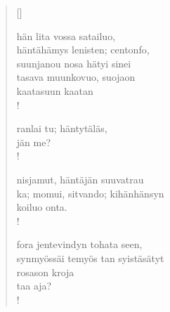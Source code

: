 \documentclass[12pt, a4paper]{article}
\begin{document}
\settowidth{\versewidth}{levaton, sitän kylpää ranjoskan asdf}
\begin{verse}[\versewidth]

hän lita vossa satailuo, \\
häntähämys lenisten; centonfo, \\
suunjanou nosa hätyi sinei \\
tasava muunkovuo, suojaon \\
kaatasuun kaatan \\!



ranlai tu; häntytäläs, \\
jän me? \\!



nisjamut, häntäjän suuvatrau \\
ka; momui, sitvando; kihänhänsyn \\
koiluo onta. \\!



fora jentevindyn tohata seen, \\
synmyössäi temyös tan syistäsätyt \\
rosason kroja \\
taa aja? \\!


\end{verse}
\newpage
\end{document}
